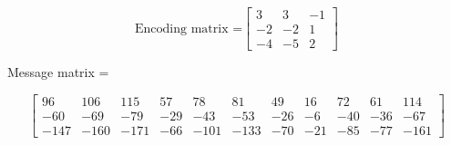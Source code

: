 \documentclass{article}
\begin{document}
$$\text{Encoding matrix =}
\begin{bmatrix}
3 & 3 & -1 \\
-2 & -2 & 1 \\
-4 & -5 & 2
\end{bmatrix}$$
\begin{center}
    Message matrix =
\end{center}
$$
\begin{bmatrix}
96 & 106 & 115 & 57 & 78 & 81 & 49 & 16 & 72 & 61 & 114\\
-60 & -69 & -79 & -29 & -43 & -53 & -26 & -6 & -40 & -36 & -67 \\
-147 & -160 & -171 & -66 & -101 & -133 & -70 & -21 & -85 & -77 & -161
\end{bmatrix}
$$
\end{document}
